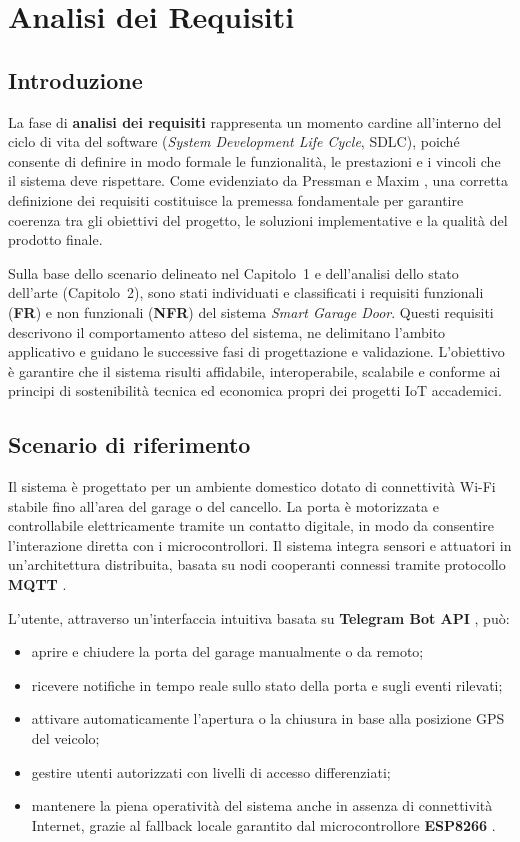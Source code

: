 \chapter{Analisi dei Requisiti}

\section{Introduzione}
La fase di \textbf{analisi dei requisiti} rappresenta un momento cardine all’interno del ciclo di vita del software (\textit{System Development Life Cycle}, SDLC), poiché consente di definire in modo formale le funzionalità, le prestazioni e i vincoli che il sistema deve rispettare.  
Come evidenziato da Pressman e Maxim \cite{Pressman2019}, una corretta definizione dei requisiti costituisce la premessa fondamentale per garantire coerenza tra gli obiettivi del progetto, le soluzioni implementative e la qualità del prodotto finale.

Sulla base dello scenario delineato nel Capitolo~1 e dell’analisi dello stato dell’arte (Capitolo~2), sono stati individuati e classificati i requisiti funzionali (\textbf{FR}) e non funzionali (\textbf{NFR}) del sistema \textit{Smart Garage Door}.  
Questi requisiti descrivono il comportamento atteso del sistema, ne delimitano l’ambito applicativo e guidano le successive fasi di progettazione e validazione.  
L’obiettivo è garantire che il sistema risulti affidabile, interoperabile, scalabile e conforme ai principi di sostenibilità tecnica ed economica propri dei progetti IoT accademici.

\section{Scenario di riferimento}
Il sistema è progettato per un ambiente domestico dotato di connettività Wi-Fi stabile fino all’area del garage o del cancello.  
La porta è motorizzata e controllabile elettricamente tramite un contatto digitale, in modo da consentire l’interazione diretta con i microcontrollori.  
Il sistema integra sensori e attuatori in un’architettura distribuita, basata su nodi cooperanti connessi tramite protocollo \textbf{MQTT} \cite{MQTTspec}.  

L’utente, attraverso un’interfaccia intuitiva basata su \textbf{Telegram Bot API} \cite{TelegramAPI}, può:
\begin{itemize}
    \item aprire e chiudere la porta del garage manualmente o da remoto;
    \item ricevere notifiche in tempo reale sullo stato della porta e sugli eventi rilevati;
    \item attivare automaticamente l’apertura o la chiusura in base alla posizione GPS del veicolo;
    \item gestire utenti autorizzati con livelli di accesso differenziati;
    \item mantenere la piena operatività del sistema anche in assenza di connettività Internet, grazie al fallback locale garantito dal microcontrollore \textbf{ESP8266} \cite{ESP8266}.
\end{itemize}

